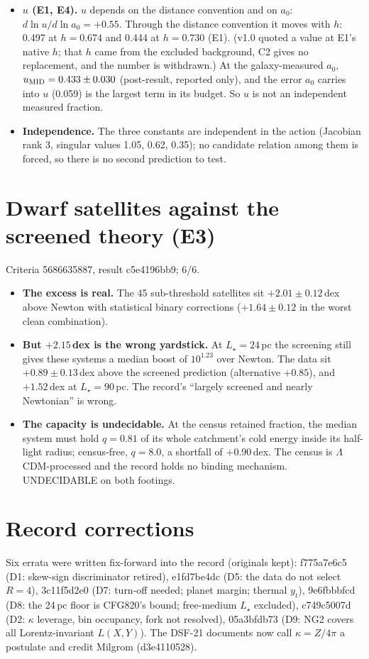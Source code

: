 \documentclass[10pt]{article}
\begin{document}
\begin{itemize}
\item \textbf{$u$ (E1, E4).} $u$ depends on the distance convention and on $a_0$: $d\ln u/d\ln a_0=+0.55$. Through the distance convention it moves with $h$: 0.497 at $h=0.674$ and 0.444 at $h=0.730$ (E1). (v1.0 quoted a value at E1's native $h$; that $h$ came from the excluded background, C2 gives no replacement, and the number is withdrawn.) At the galaxy-measured $a_0$, $u_{\rm MID}=0.433\pm0.030$ (post-result, reported only), and the error $a_0$ carries into $u$ (0.059) is the largest term in its budget. So $u$ is not an independent measured fraction.
\item \textbf{Independence.} The three constants are independent in the action (Jacobian rank 3, singular values 1.05, 0.62, 0.35); no candidate relation among them is forced, so there is no second prediction to test.
\end{itemize}

\section{Dwarf satellites against the screened theory (E3)}
Criteria 5686635887, result c5e4196bb9; 6/6.
\begin{itemize}
\item \textbf{The excess is real.} The 45 sub-threshold satellites sit $+2.01\pm0.12$\,dex above Newton with statistical binary corrections ($+1.64\pm0.12$ in the worst clean combination).
\item \textbf{But $+2.15$\,dex is the wrong yardstick.} At $L_\star=24$\,pc the screening still gives these systems a median boost of $10^{1.23}$ over Newton. The data sit $+0.89\pm0.13$\,dex above the screened prediction (alternative $+0.85$), and $+1.52$\,dex at $L_\star=90$\,pc. The record's ``largely screened and nearly Newtonian'' is wrong.
\item \textbf{The capacity is undecidable.} At the census retained fraction, the median system must hold $q=0.81$ of its whole catchment's cold energy inside its half-light radius; census-free, $q=8.0$, a shortfall of $+0.90$\,dex. The census is $\Lambda$CDM-processed and the record holds no binding mechanism. UNDECIDABLE on both footings.
\end{itemize}

\section{Record corrections}
Six errata were written fix-forward into the record (originals kept): f775a7e6c5 (D1: skew-sign discriminator retired), e1fd7be4dc (D5: the data do not select $R=4$), 3c11f5d2e0 (D7: turn-off needed; planet margin; thermal $y_t$), 9e6fbbbfcd (D8: the 24\,pc floor is CFG820's bound; free-medium $L_\star$ excluded), c749c5007d (D2: $\kappa$ leverage, bin occupancy, fork not resolved), 05a3bfdb73 (D9: NG2 covers all Lorentz-invariant $L(X,Y)$). The DSF-21 documents now call $\kappa=Z/4\pi$ a postulate and credit Milgrom (d3e4110528).
\end{document}
